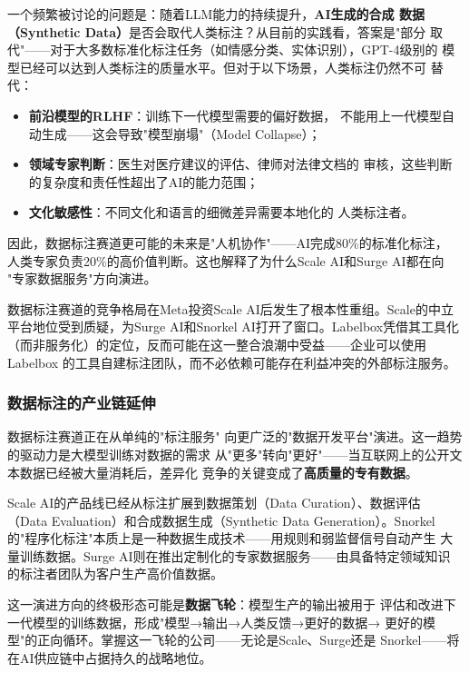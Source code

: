 \begin{whybox}
一个频繁被讨论的问题是：随着LLM能力的持续提升，\textbf{AI生成的合成
数据（Synthetic Data）}是否会取代人类标注？从目前的实践看，答案是"部分
取代"——对于大多数标准化标注任务（如情感分类、实体识别），GPT-4级别的
模型已经可以达到人类标注的质量水平。但对于以下场景，人类标注仍然不可
替代：
\begin{itemize}
  \item \textbf{前沿模型的RLHF}：训练下一代模型需要的偏好数据，
    不能用上一代模型自动生成——这会导致"模型崩塌"（Model Collapse）；
  \item \textbf{领域专家判断}：医生对医疗建议的评估、律师对法律文档的
    审核，这些判断的复杂度和责任性超出了AI的能力范围；
  \item \textbf{文化敏感性}：不同文化和语言的细微差异需要本地化的
    人类标注者。
\end{itemize}

因此，数据标注赛道更可能的未来是"人机协作"——AI完成80\%的标准化标注，
人类专家负责20\%的高价值判断。这也解释了为什么Scale AI和Surge AI都在向
"专家数据服务"方向演进。
\end{whybox}

数据标注赛道的竞争格局在Meta投资Scale AI后发生了根本性重组。Scale的中立
平台地位受到质疑，为Surge AI和Snorkel AI打开了窗口。Labelbox凭借其工具化
（而非服务化）的定位，反而可能在这一整合浪潮中受益——企业可以使用Labelbox
的工具自建标注团队，而不必依赖可能存在利益冲突的外部标注服务。

\subsubsection{数据标注的产业链延伸} 数据标注赛道正在从单纯的"标注服务"
向更广泛的"数据开发平台"演进。这一趋势的驱动力是大模型训练对数据的需求
从"更多"转向"更好"——当互联网上的公开文本数据已经被大量消耗后，差异化
竞争的关键变成了\textbf{高质量的专有数据}。

Scale AI的产品线已经从标注扩展到数据策划（Data Curation）、数据评估
（Data Evaluation）和合成数据生成（Synthetic Data Generation）。Snorkel
的"程序化标注"本质上是一种数据生成技术——用规则和弱监督信号自动产生
大量训练数据。Surge AI则在推出定制化的专家数据服务——由具备特定领域知识
的标注者团队为客户生产高价值数据。

这一演进方向的终极形态可能是\textbf{数据飞轮}：模型生产的输出被用于
评估和改进下一代模型的训练数据，形成"模型→输出→人类反馈→更好的数据→
更好的模型"的正向循环。掌握这一飞轮的公司——无论是Scale、Surge还是
Snorkel——将在AI供应链中占据持久的战略地位。

